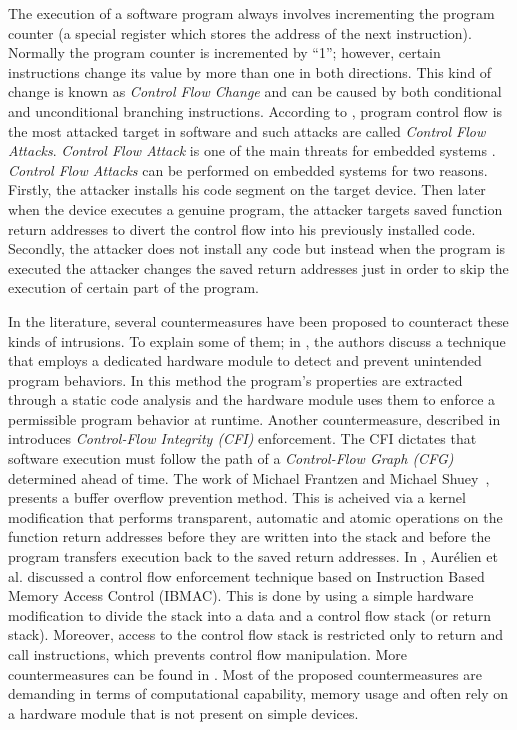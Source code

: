 \documentclass[lnicst]{svmultln}
\begin{document}
The execution of a software program always involves incrementing the program counter (a special register which stores the address of the next instruction). Normally the program counter is incremented by ``1''; however, certain instructions change its value by more than one in both directions. This kind of change is known as \emph{Control Flow Change} and can be caused by both conditional and unconditional branching instructions. According to \cite{DAES-08-ST}, program control flow is the most attacked target in software and such attacks are called \emph{Control Flow Attacks}. \emph{Control Flow Attack} is one of the main threats for embedded systems \cite{CARDIS-11-GJJ,ACM-08-AC,SECWEST-13-D}. \emph{Control Flow Attacks} can be performed on embedded systems for two reasons. Firstly, the attacker installs his code segment on the target device. Then later when the device executes a genuine program, the attacker targets saved function return addresses to divert the control flow into his previously installed code. Secondly, the attacker does not install any code but instead when the program is executed the attacker changes the saved return addresses just in order to skip the execution of certain part of the program.

In the literature, several countermeasures have been proposed to counteract these kinds of intrusions. To explain some of them; in \cite{IEEE-06-DSAN}, the authors discuss a technique that employs a dedicated hardware module to detect and prevent unintended program behaviors. In this method the program's properties are extracted through a static code analysis and the hardware module uses them to enforce a permissible program behavior at runtime. Another countermeasure, described in~\cite{ACM-09-MMUJ} introduces \emph{Control-Flow Integrity (CFI)} enforcement. The CFI dictates that software execution must follow the path of a \emph{Control-Flow Graph (CFG)} determined ahead of time. The work of Michael Frantzen and Michael Shuey~\cite{USENIX-01-MM}, presents a buffer overflow prevention method. This is acheived via a kernel modification that performs transparent, automatic and atomic operations on the function return addresses before they are written into the stack and before the program transfers execution back to the saved return addresses. In \cite{ACM-09-ADC}, Aur{\'e}lien et al. discussed a control flow enforcement technique based on Instruction Based Memory Access Control (IBMAC). This is done by using a simple hardware modification to divide the stack into a data and a control flow stack (or return stack). Moreover, access to the control flow stack is restricted only to return and call instructions, which prevents control flow manipulation. More countermeasures can be found in \cite{ACSAC-06-CJCJP,USENIX-98-CCDHJPSAPQ,ASPLOS-04-GJDS}. Most of the proposed countermeasures are demanding in terms of computational capability, memory usage and often rely on a hardware module that is not present on simple devices.
\end{document}
